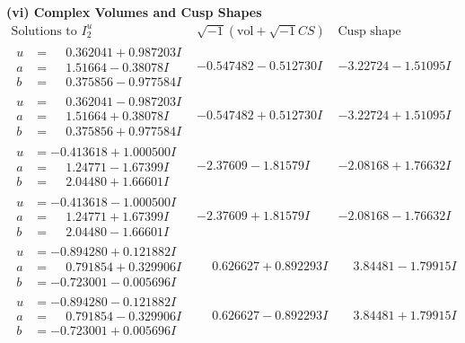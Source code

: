 \documentclass[1p]{elsarticle_modified}
\theoremstyle{definition}
\newcommand{\I}{\sqrt{-1}}
\begin{document}
\newpage\flushleft \textbf{(vi) Complex Volumes and Cusp Shapes}
$$\begin{array}{c|c|c}  
\text{Solutions to }I^u_{2}& \I (\text{vol} + \sqrt{-1}CS) & \text{Cusp shape}\\
 \hline 
\begin{aligned}
u &= \phantom{-}0.362041 + 0.987203 I \\
a &= \phantom{-}1.51664 - 0.38078 I \\
b &= \phantom{-}0.375856 - 0.977584 I\end{aligned}
 & -0.547482 - 0.512730 I & -3.22724 - 1.51095 I \\ \hline\begin{aligned}
u &= \phantom{-}0.362041 - 0.987203 I \\
a &= \phantom{-}1.51664 + 0.38078 I \\
b &= \phantom{-}0.375856 + 0.977584 I\end{aligned}
 & -0.547482 + 0.512730 I & -3.22724 + 1.51095 I \\ \hline\begin{aligned}
u &= -0.413618 + 1.000500 I \\
a &= \phantom{-}1.24771 - 1.67399 I \\
b &= \phantom{-}2.04480 + 1.66601 I\end{aligned}
 & -2.37609 - 1.81579 I & -2.08168 + 1.76632 I \\ \hline\begin{aligned}
u &= -0.413618 - 1.000500 I \\
a &= \phantom{-}1.24771 + 1.67399 I \\
b &= \phantom{-}2.04480 - 1.66601 I\end{aligned}
 & -2.37609 + 1.81579 I & -2.08168 - 1.76632 I \\ \hline\begin{aligned}
u &= -0.894280 + 0.121882 I \\
a &= \phantom{-}0.791854 + 0.329906 I \\
b &= -0.723001 - 0.005696 I\end{aligned}
 & \phantom{-}0.626627 + 0.892293 I & \phantom{-}3.84481 - 1.79915 I \\ \hline\begin{aligned}
u &= -0.894280 - 0.121882 I \\
a &= \phantom{-}0.791854 - 0.329906 I \\
b &= -0.723001 + 0.005696 I\end{aligned}
 & \phantom{-}0.626627 - 0.892293 I & \phantom{-}3.84481 + 1.79915 I \\ \hline\begin{aligned}

\end{aligned}
\end{array}$$
\end{document}
